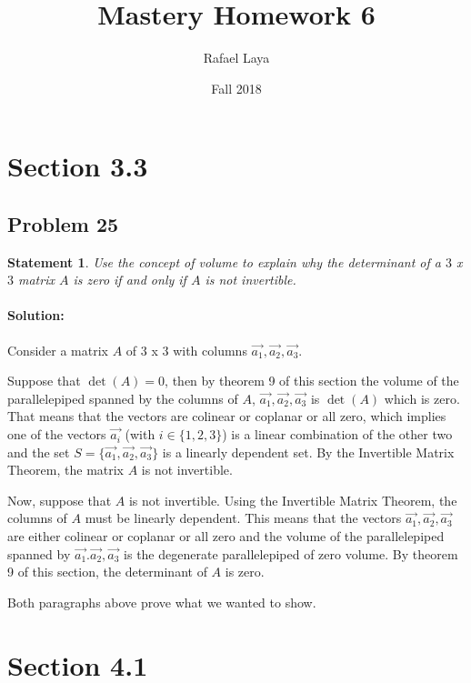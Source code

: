 \documentclass[12pt, letterpaper]{article}
\title{Mastery Homework 6}
\author{Rafael Laya}
\date{Fall 2018}
\theoremstyle{statement}
\theoremstyle{statement}
\newtheorem*{atmStat}{Statement}
\newenvironment{Solution}{\noindent\ignorespaces\paragraph{Solution:}}{\hfill \ding{122}\par\noindent}
\begin{document}
    \maketitle
    
    \section*{Section 3.3}
    \subsection*{Problem 25}
    \begin{atmStat}
    Use the concept of volume to explain why the determinant of a $3$ x $3$ matrix $A$ is zero if and only if $A$ is not invertible. 
    \end{atmStat}
    \begin{Solution}
    Consider a matrix $A$ of $3$ x $3$ with columns $\Vec{a_1}, \Vec{a_2}, \Vec{a_3}$.
    
    Suppose that $\det(A)=0$, then by theorem 9 of this section the volume of the parallelepiped spanned by the columns of $A$, $\Vec{a_1}, \Vec{a_2}, \Vec{a_3}$ is $\det(A)$ which is zero. That means that the vectors are colinear or coplanar or all zero, which implies one of the vectors $\Vec{a_i}$ (with $i\in\{1, 2, 3\}$) is a linear combination of the other two and the set $S=\{\Vec{a_1}, \Vec{a_2}, \Vec{a_3}\}$ is a linearly dependent set. By the Invertible Matrix Theorem, the matrix $A$ is not invertible.
    
    Now, suppose that $A$ is not invertible. Using the Invertible Matrix Theorem, the columns of $A$ must be linearly dependent. This means that the vectors $\Vec{a_1}, \Vec{a_2}, \Vec{a_3}$ are either colinear or coplanar or all zero and the volume of the parallelepiped spanned by $\Vec{a_1}. \Vec{a_2}, \Vec{a_3}$ is the degenerate parallelepiped of zero volume. By theorem 9 of this section, the determinant of $A$ is zero. 
    
    Both paragraphs above prove what we wanted to show.
    \end{Solution} 
    
    \section*{Section 4.1}
\end{document}
